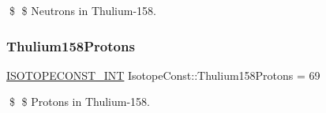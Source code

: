 \$ \$ Neutrons in Thulium-\/158. \mbox{\label{group___isotope_const-_thulium-_tm158_ga6eb40dce7488321412b81ae02bb015cf}} 
\subsubsection{\texorpdfstring{Thulium158\+Protons}{Thulium158Protons}}
{\footnotesize\ttfamily \mbox{\hyperlink{group___isotope_const-_macros_ga5f18360b3e99483a35c32d789e62621c}{I\+S\+O\+T\+O\+P\+E\+C\+O\+N\+S\+T\+\_\+\+I\+NT}} Isotope\+Const\+::\+Thulium158\+Protons = 69}

\$ \$ Protons in Thulium-\/158. 